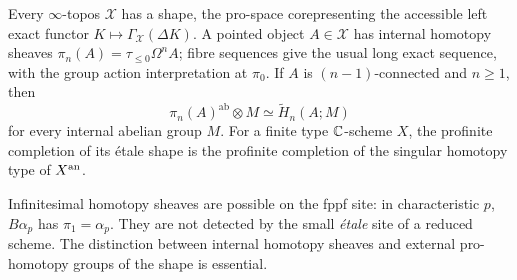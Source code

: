\begin{theorem}\label{thm:B3-homotopy}
Every $\infty$-topos $\mathcal X$ has a shape, the pro-space
corepresenting the accessible left exact functor
$K\mapsto\Gamma_{\mathcal X}(\Delta K)$.
A pointed object $A\in\mathcal X$ has internal homotopy sheaves
$\pi_n(A)=\tau_{\leq0}\Omega^nA$; fibre sequences give the usual
long exact sequence, with the group action interpretation at
$\pi_0$. If $A$ is $(n-1)$-connected and $n\geq1$, then
\[
 \pi_n(A)^{\mathrm{ab}}\otimes M
       \simeq\widetilde H_n(A;M)
\]
for every internal abelian group $M$.
For a finite type ${\mathbb{C}}$-scheme $X$, the profinite completion of its
\'etale shape is the profinite completion of the singular homotopy
type of $X^{\rm an}$.

Infinitesimal homotopy sheaves are possible on the fppf site:
in characteristic $p$, $B\alpha_p$ has $\pi_1=\alpha_p$.
They are not detected by the small \emph{\'etale} site of a reduced
scheme. The distinction between internal homotopy sheaves and
external pro-homotopy groups of the shape is essential.
\end{theorem}

